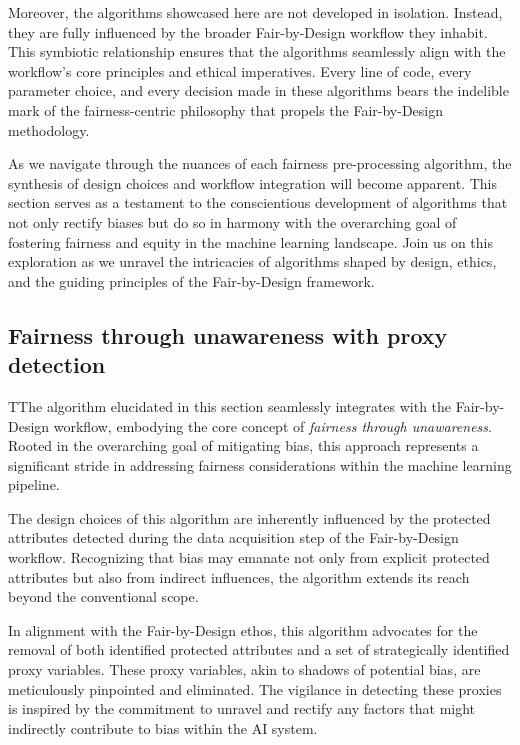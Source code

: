 \documentclass[12pt,a4paper,openright,twoside]{book}
\begin{document}
Moreover, the algorithms showcased here are not developed in isolation. Instead, they are fully influenced by the broader Fair-by-Design workflow they inhabit. This symbiotic relationship ensures that the algorithms seamlessly align with the workflow's core principles and ethical imperatives. Every line of code, every parameter choice, and every decision made in these algorithms bears the indelible mark of the fairness-centric philosophy that propels the Fair-by-Design methodology.

As we navigate through the nuances of each fairness pre-processing algorithm, the synthesis of design choices and workflow integration will become apparent. This section serves as a testament to the conscientious development of algorithms that not only rectify biases but do so in harmony with the overarching goal of fostering fairness and equity in the machine learning landscape. Join us on this exploration as we unravel the intricacies of algorithms shaped by design, ethics, and the guiding principles of the Fair-by-Design framework.

\subsection{Fairness through unawareness with proxy detection}

TThe algorithm elucidated in this section seamlessly integrates with the Fair-by-Design workflow, embodying the core concept of \emph{fairness through unawareness}. Rooted in the overarching goal of mitigating bias, this approach represents a significant stride in addressing fairness considerations within the machine learning pipeline.

The design choices of this algorithm are inherently influenced by the protected attributes detected during the data acquisition step of the Fair-by-Design workflow. Recognizing that bias may emanate not only from explicit protected attributes but also from indirect influences, the algorithm extends its reach beyond the conventional scope.

In alignment with the Fair-by-Design ethos, this algorithm advocates for the removal of both identified protected attributes and a set of strategically identified proxy variables. These proxy variables, akin to shadows of potential bias, are meticulously pinpointed and eliminated. The vigilance in detecting these proxies is inspired by the commitment to unravel and rectify any factors that might indirectly contribute to bias within the AI system.
\end{document}
